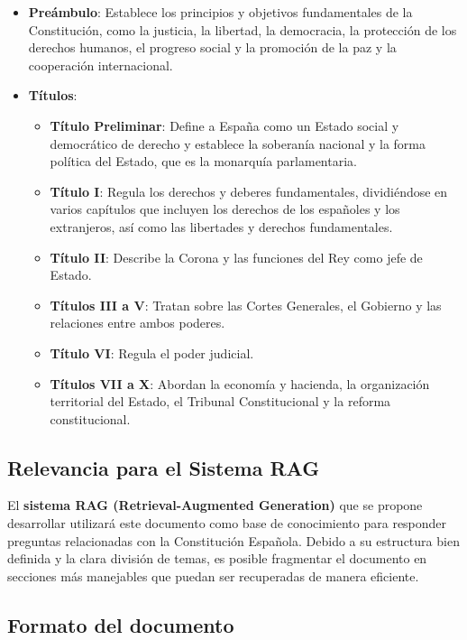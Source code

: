 \begin{itemize}
    \item \textbf{Preámbulo}: Establece los principios y objetivos fundamentales de la Constitución, como la justicia, la libertad, la democracia, la protección de los derechos humanos, el progreso social y la promoción de la paz y la cooperación internacional.
    \item \textbf{Títulos}:
    \begin{itemize}
        \item \textbf{Título Preliminar}: Define a España como un Estado social y democrático de derecho y establece la soberanía nacional y la forma política del Estado, que es la monarquía parlamentaria.
        \item \textbf{Título I}: Regula los derechos y deberes fundamentales, dividiéndose en varios capítulos que incluyen los derechos de los españoles y los extranjeros, así como las libertades y derechos fundamentales.
        \item \textbf{Título II}: Describe la Corona y las funciones del Rey como jefe de Estado.
        \item \textbf{Títulos III a V}: Tratan sobre las Cortes Generales, el Gobierno y las relaciones entre ambos poderes.
        \item \textbf{Título VI}: Regula el poder judicial.
        \item \textbf{Títulos VII a X}: Abordan la economía y hacienda, la organización territorial del Estado, el Tribunal Constitucional y la reforma constitucional.
    \end{itemize}
\end{itemize}

\subsection{Relevancia para el Sistema RAG}

El \textbf{sistema RAG (Retrieval-Augmented Generation)} que se propone desarrollar utilizará este documento como base de conocimiento para responder preguntas relacionadas con la Constitución Española. Debido a su estructura bien definida y la clara división de temas, es posible fragmentar el documento en secciones más manejables que puedan ser recuperadas de manera eficiente.

\subsection{Formato del documento}

